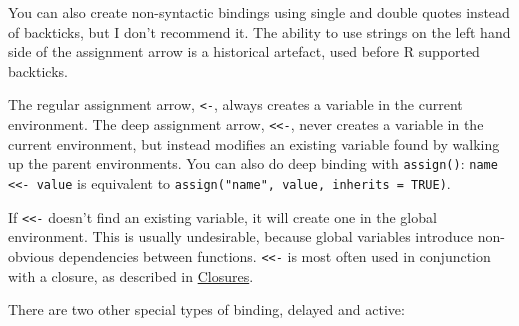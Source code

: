 \begin{shortbox}

You can also create non-syntactic bindings using single and double
quotes instead of backticks, but I don't recommend it. The ability to
use strings on the left hand side of the assignment arrow is a
historical artefact, used before R supported backticks.

\end{shortbox}

The regular assignment arrow, \texttt{\textless{}-}, always creates a
variable in the current environment. The deep assignment arrow,
\texttt{\textless{}\textless{}-}, never creates a variable in the
current environment, but instead modifies an existing variable found by
walking up the parent environments. You can also do deep binding with
\texttt{assign()}: \texttt{name \textless{}\textless{}- value} is
equivalent to \texttt{assign("name", value, inherits = TRUE)}.

\begin{Shaded}
\begin{Highlighting}[]
\StringTok{ }
\StringTok{ }
  \StringTok{ }
\NormalTok{\}}
\NormalTok{()}
\end{Highlighting}
\end{Shaded}

If \texttt{\textless{}\textless{}-} doesn't find an existing variable,
it will create one in the global environment. This is usually
undesirable, because global variables introduce non-obvious dependencies
between functions. \texttt{\textless{}\textless{}-} is most often used
in conjunction with a closure, as described in
\hyperref[closures]{Closures}.

There are two other special types of binding, delayed and active:

